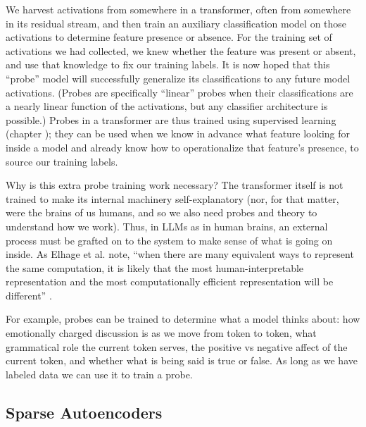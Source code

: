 We harvest activations from somewhere in a transformer, often from somewhere in
its residual stream, and then train an auxiliary classification model on those
activations to determine feature presence or absence. For the training set of
activations we had collected, we knew whether the feature was present or
absent, and use that knowledge to fix our training labels. It is now hoped that
this ``probe'' model will successfully generalize its classifications to any
future model activations. (Probes are specifically ``linear'' probes when their
classifications are a nearly linear function of the activations, but any
classifier architecture is possible.) Probes in a transformer are thus trained
using supervised learning (chapter ); they can be used
when we know in advance what feature looking for inside a model and already
know how to operationalize that feature's presence, to source our training
labels.

Why is this extra probe training work necessary? The transformer itself is not
trained to make its internal machinery self-explanatory (nor, for that matter,
were the brains of us humans, and so we also need probes and theory to
understand how we work). Thus, in LLMs as in human brains, an external process
must be grafted on to the system to make sense of what is going on inside. As
Elhage et al. note, ``when there are many equivalent ways to represent the same
computation, it is likely that the most human-interpretable representation and
the most computationally efficient representation will be different''
\cite{elhage2021mathematical}.

For example, probes can be trained to determine what a model thinks about: how
emotionally charged discussion is as we move from token to token, what
grammatical role the current token serves, the positive vs negative affect of
the current token, and whether what is being said is true or false. As long as
we have labeled data we can use it to train a probe.

\subsection{Sparse Autoencoders}


